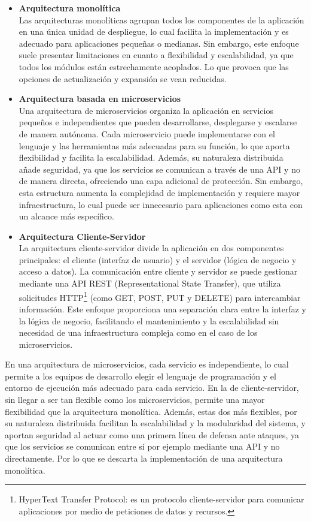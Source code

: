 \begin{itemize}
\item \textbf{Arquitectura monolítica}\\
Las arquitecturas monolíticas agrupan todos los componentes de la aplicación en una única unidad de despliegue, lo cual facilita la implementación y es adecuado para aplicaciones pequeñas o medianas. Sin embargo, este enfoque suele presentar limitaciones en cuanto a flexibilidad y escalabilidad, ya que todos los módulos están estrechamente acoplados. Lo que provoca que las opciones de actualización y expansión se vean reducidas.

\item \textbf{Arquitectura basada en microservicios}\\
Una arquitectura de microservicios organiza la aplicación en servicios pequeños e independientes que pueden desarrollarse, desplegarse y escalarse de manera autónoma. Cada microservicio puede implementarse con el lenguaje y las herramientas más adecuadas para su función, lo que aporta flexibilidad y facilita la escalabilidad. Además, su naturaleza distribuida añade seguridad, ya que los servicios se comunican a través de una API y no de manera directa, ofreciendo una capa adicional de protección. Sin embargo, esta estructura aumenta la complejidad de implementación y requiere mayor infraestructura, lo cual puede ser innecesario para aplicaciones como esta con un alcance más específico\cite{RedHat2023}\cite{lopez2017arquitectura}.

\item \textbf{Arquitectura Cliente-Servidor}\\
La arquitectura cliente-servidor divide la aplicación en dos componentes principales: el cliente (interfaz de usuario) y el servidor (lógica de negocio y acceso a datos). La comunicación entre cliente y servidor se puede gestionar mediante una API REST (Representational State Transfer), que utiliza solicitudes HTTP\footnote{HyperText Transfer Protocol: es un protocolo cliente-servidor para comunicar aplicaciones por medio de peticiones de datos y recursos.} (como GET, POST, PUT y DELETE) para intercambiar información. Este enfoque proporciona una separación clara entre la interfaz y la lógica de negocio, facilitando el mantenimiento y la escalabilidad sin necesidad de una infraestructura compleja como en el caso de los microservicios.

\end{itemize}

En una arquitectura de microservicios, cada servicio es independiente, lo cual permite a los equipos de desarrollo elegir el lenguaje de programación y el entorno de ejecución más adecuado para cada servicio. En la de cliente-servidor, sin llegar a ser tan flexible como los microservicios, permite una mayor flexibilidad que la arquitectura monolítica. Además, estas dos más flexibles, por su naturaleza distribuida facilitan la escalabilidad y la modularidad del sistema, y aportan seguridad al actuar como una primera línea de defensa ante ataques, ya que los servicios se comunican entre sí por ejemplo mediante una API y no directamente. Por lo que se descarta la implementación de una arquitectura monolítica.

